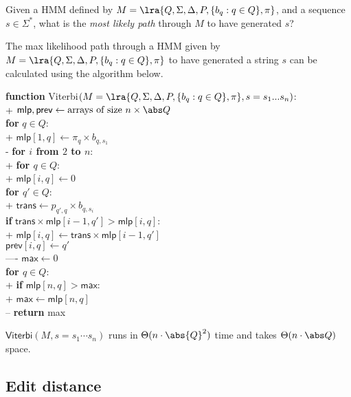 \documentclass{article}
\begin{document}
\begin{definition}
	Given a HMM defined by $M=\lra{Q,\Sigma,\Delta,P,\{b_q:q\in Q\},\pi}$, and
	a sequence $s\in\Sigma^*$, what is the \emph{most likely path} through $M$
	to have generated $s$?
\end{definition}

\begin{theorem}[L19]
	The max likelihood path through a HMM given by $M=\lra{Q,\Sigma,\Delta,
			P,\{b_q:q\in Q\},\pi}$ to have generated a string $s$ can be calculated
	using the algorithm below.
	\begin{pseudo}
		\textbf{function} \textsf{Viterbi}$(M=\lra{Q,\Sigma,\Delta, P,
				\{b_q:q\in Q\},\pi}, s=s_1...s_n)$:									\\+
		$\textsf{mlp}, \textsf{prev}
			\leftarrow \text{arrays of size $n\times\abs Q$}$				\\
		\textbf{for} $q\in Q$:												\\+
		$\textsf{mlp}[1,q]\leftarrow\pi_q\times b_{q,s_1}$				\\-
		\textbf{for $i$ from $2$ to $n$}:									\\+
		\textbf{for $q\in Q$}:											\\+
		$\textsf{mlp}[i,q]\leftarrow 0$								\\
		\textbf{for $q'\in Q$}:										\\+
		$\textsf{trans}\leftarrow p_{q',q}\times b_{q,s_i}$	\\
		\textbf{if} $\textsf{trans}\times\textsf{mlp}[i-1,q']>
			\textsf{mlp}[i,q]$:									\\+
		$\textsf{mlp}[i,q]\leftarrow
			\textsf{trans}\times\textsf{mlp}[i-1,q']$		\\
		$\textsf{prev}[i,q]\leftarrow q'$					\\----
		$\textsf{max}\leftarrow 0$											\\
		\textbf{for $q\in Q$}:												\\+
		\textbf{if} $\textsf{mlp}[n,q]>\textsf{max}$:					\\+
		$\textsf{max}\leftarrow\textsf{mlp}[n,q]$					\\--
		\textbf{return} \textsf{max}
	\end{pseudo}
	$\textsf{Viterbi}(M, s=s_1\cdots s_n)$ runs in $\Theta(n\cdot\abs{Q}^2)$ time
	and takes $\Theta(n\cdot\abs Q)$ space.
\end{theorem}

\subsection{Edit distance}
\end{document}
